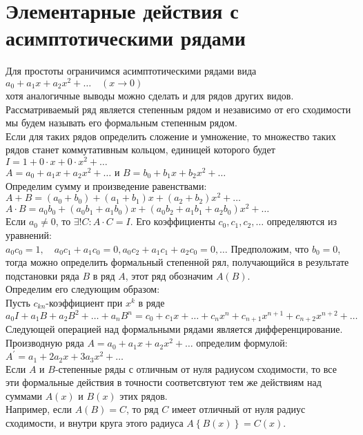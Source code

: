 \documentclass{report}
\begin{document}
\section{Элементарные действия с асимптотическими рядами}
Для простоты ограничимся асимптотическими рядами вида \\
$a_0+a_1x+a_2x^{2}+\dots\quad(x\to{0})$ \\
хотя аналогичные выводы можно сделать и для рядов других видов. \\
Рассматриваемый ряд является степенным рядом и независимо от его сходимости мы будем называть его формальным степенным рядом. \\
Если для таких рядов определить сложение и умножение, то множество таких рядов станет коммутативным кольцом, единицей которого будет $I=1+0\cdot{x}+0\cdot{x^{2}}+\dots$ \\
$A=a_0+a_1x+a_2x^{2}+\dots$ и $B=b_0+b_1x+b_2x^{2}+\dots$ \\
Определим сумму и произведение равенствами: \\
$A+B=(a_0+b_0)+(a_1+b_1)x+(a_2+b_2)x^{2}+\dots$ \\
$A\cdot{B}=a_0b_0+(a_0b_1+a_1b_0)x+(a_0b_2+a_1b_1+a_2b_0)x^{2}+\dots$ \\
Если $a_0\neq{0}$, то $\exists!{C}: A\cdot{C}=I$. Его коэффициенты $c_0,c_1,c_2,\dots$ определяются из уравнений: \\
$a_0c_0=1,\quad a_0c_1+a_1c_0=0, a_0c_2+a_1c_1+a_2c_0=0,\dots$
Предположим, что $b_0=0$, тогда можно определить формальный степенной рял, получающийся в результате подстановки ряда $B$ в ряд $A$, этот ряд обозначим $A(B)$.\\
Определим его следующим образом: \\
Пусть $c_{kn}$-коэффициент при $x^{k}$ в ряде $a_0I+a_1B+a_2B^{2}+\dots+a_nB^{n} = c_0 +c_1x+\dots+c_nx^{n}+c_{n+1}x^{n+1}+c_{n+2}x^{n+2}+\dots$ \\
Следующей операцией над формальными рядами является дифференцирование. Производную ряда $A=a_0+a_1x+a_2x^{2}+\dots$ определим формулой: \\
$A^{\prime}=a_1+2a_2x+3a_3x^{2}+\dots$ \\
Если $A$ и $B$-степенные ряды с отличным от нуля радиусом сходимости, то все эти формальные действия в точности соответсвтуют тем же действиям над суммами $A(x)$ и $B(x)$ этих рядов.\\
Например, если $A(B)=C$, то ряд $C$ имеет отличный от нуля радиус сходимости, и внутри круга этого радиуса $A\left\{B(x)\right\}=C(x)$. \\
\end{document}
